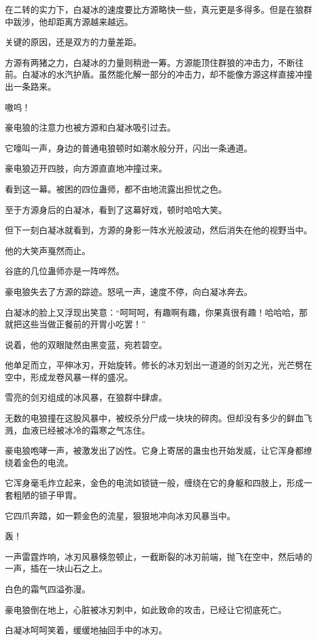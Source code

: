 \begin{this_body}
在二转的实力下，白凝冰的速度要比方源略快一些，真元更是多得多。但是在狼群中跋涉，他却距离方源越来越远。

关键的原因，还是双方的力量差距。

方源有两猪之力，白凝冰的力量则稍逊一筹。方源能顶住群狼的冲击力，不断往前。白凝冰的水汽护盾。虽然能化解一部分的冲击力，却不能像方源这样直接冲撞出一条路来。

嗷呜！

豪电狼的注意力也被方源和白凝冰吸引过去。

它嚎叫一声，身边的普通电狼顿时如潮水般分开，闪出一条通道。

豪电狼迈开四肢，向方源直直地冲撞过来。

看到这一幕。被困的四位蛊师，都不由地流露出担忧之色。

至于方源身后的白凝冰，看到了这幕好戏，顿时哈哈大笑。

但下一刻白凝冰就看到，方源的身影一阵水光般波动，然后消失在他的视野当中。

他的大笑声戛然而止。

谷底的几位蛊师亦是一阵哗然。

豪电狼失去了方源的踪迹。怒吼一声，速度不停，向白凝冰奔去。

白凝冰的脸上又浮现出笑意：“呵呵呵，有趣啊有趣，你果真很有趣！哈哈哈，那就把这些当做正餐前的开胃小吃罢！”

说着，他的双眼陡然由黑变蓝，宛若碧空。

他单足而立，平伸冰刃，开始旋转。修长的冰刃划出一道道的剑刃之光，光芒劈在空中，形成龙卷风暴一样的盛况。

雪亮的剑刃组成的冰风暴，在狼群中肆虐。

无数的电狼撞在这股风暴中，被绞杀分尸成一块块的碎肉。但却没有多少的鲜血飞溅，血液已经被冰冷的霜寒之气冻住。

豪电狼咆哮一声，被激发出了凶性。它身上寄居的蛊虫也开始发威，让它浑身都缭绕着金色的电流。

它浑身毫毛炸立起来，金色的电流如锁链一般，缠绕在它的身躯和四肢上，形成一套粗陋的锁子甲胄。

它四爪奔踏，如一颗金色的流星，狠狠地冲向冰刃风暴当中。

轰！

一声雷霆炸响，冰刃风暴倏忽顿止，一截断裂的冰刃前端，抛飞在空中，然后哧的一声，插在一块山石之上。

白色的霜气四溢弥漫。

豪电狼倒在地上，心脏被冰刃刺中，如此致命的攻击，已经让它彻底死亡。

白凝冰呵呵笑着，缓缓地抽回手中的冰刃。


\end{this_body}
